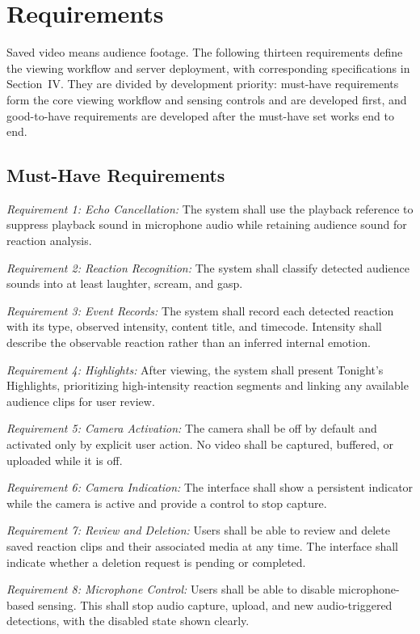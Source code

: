 \section{Requirements}
Saved video means audience footage. The following thirteen requirements define the viewing workflow and server deployment, with corresponding specifications in Section~IV. They are divided by development priority: must-have requirements form the core viewing workflow and sensing controls and are developed first, and good-to-have requirements are developed after the must-have set works end to end.

\subsection{Must-Have Requirements}
\noindent\textit{Requirement 1: Echo Cancellation:} The system shall use the playback reference to suppress playback sound in microphone audio while retaining audience sound for reaction analysis.

\noindent\textit{Requirement 2: Reaction Recognition:} The system shall classify detected audience sounds into at least laughter, scream, and gasp.

\noindent\textit{Requirement 3: Event Records:} The system shall record each detected reaction with its type, observed intensity, content title, and timecode. Intensity shall describe the observable reaction rather than an inferred internal emotion.

\noindent\textit{Requirement 4: Highlights:} After viewing, the system shall present Tonight's Highlights, prioritizing high-intensity reaction segments and linking any available audience clips for user review.

\noindent\textit{Requirement 5: Camera Activation:} The camera shall be off by default and activated only by explicit user action. No video shall be captured, buffered, or uploaded while it is off.

\noindent\textit{Requirement 6: Camera Indication:} The interface shall show a persistent indicator while the camera is active and provide a control to stop capture.

\noindent\textit{Requirement 7: Review and Deletion:} Users shall be able to review and delete saved reaction clips and their associated media at any time. The interface shall indicate whether a deletion request is pending or completed.

\noindent\textit{Requirement 8: Microphone Control:} Users shall be able to disable microphone-based sensing. This shall stop audio capture, upload, and new audio-triggered detections, with the disabled state shown clearly.

